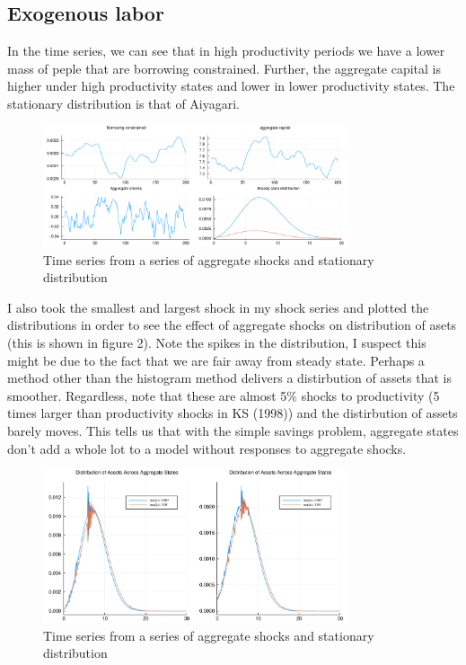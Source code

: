 \documentclass{article} %
\begin{document}
\subsection*{Exogenous labor}
In the time series, we can see that in high productivity periods we have a lower mass of peple that are borrowing constrained. Further, the aggregate capital is higher under high productivity states and lower in lower productivity states. The stationary distribution is that of Aiyagari. 
\begin{figure}[h!]
  \centering
  \includegraphics[width = 0.8\textwidth]{../exogenous/timeseries.pdf}
    \caption{Time series from a series of aggregate shocks and stationary distribution}
  \end{figure}
I also took the smallest and largest shock in my shock series and plotted the distributions in order to see the effect of aggregate shocks on distribution of asets (this is shown in figure 2). Note the spikes in the distribution, I suspect this might be due to the fact that we are fair away from steady state. Perhaps a method other than the histogram method delivers a distirbution of assets that is smoother. Regardless, note that these are almost 5\% shocks to productivity (5 times larger than productivity shocks in KS (1998)) and the distirbution of assets barely moves. This tells us that with the simple savings problem, aggregate states don't add a whole lot to a model without responses to aggregate shocks.
\begin{figure}[h!]
  \centering
  \includegraphics[width = 0.8\textwidth]{../exogenous/exodistribution.pdf}
    \caption{Time series from a series of aggregate shocks and stationary distribution}
  \end{figure}
\end{document}
